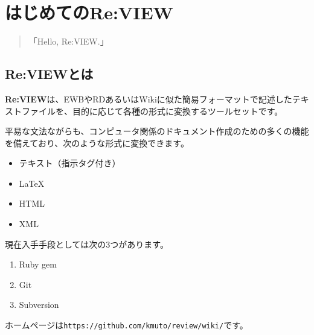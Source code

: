 \chapter{はじめてのRe:VIEW}
\label{chap:sample}

\begin{quotation}
「Hello, Re:VIEW.」
\end{quotation}

\section{Re:VIEWとは}
\label{sec:1-1}

\textbf{Re:VIEW}は、EWBやRDあるいはWikiに似た簡易フォーマットで記述したテキストファイルを、目的に応じて各種の形式に変換するツールセットです。

平易な文法ながらも、コンピュータ関係のドキュメント作成のための多くの機能を備えており、次のような形式に変換できます。

\begin{itemize}
\item テキスト（指示タグ付き）
\item LaTeX
\item HTML
\item XML
\end{itemize}

現在入手手段としては次の3つがあります。

\begin{enumerate}
\item Ruby gem
\item Git
\item Subversion
\end{enumerate}

ホームページは\texttt{https://github.com/kmuto/review/wiki/}です。
